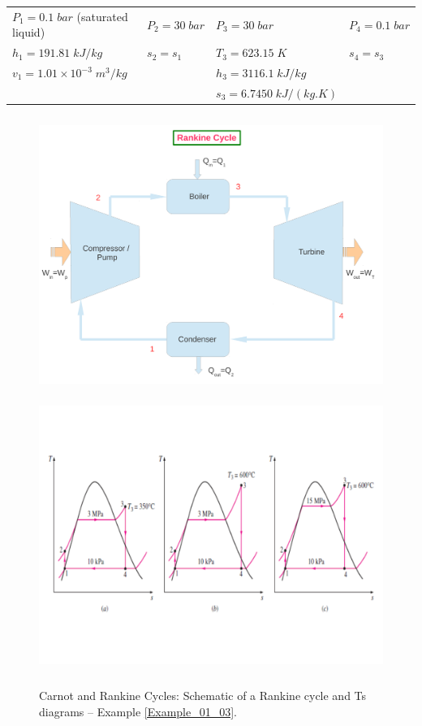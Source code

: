 \begin{enumerate}
\begin{enumerate}
\begin{tabular}{l l l l}
$P_{1}=0.1\;bar$ (saturated liquid) &  $P_{2}=30\;bar$ & $P_{3}=30\;bar$           & $P_{4}=0.1\;bar$ \\
$h_{1}=191.81\;kJ/kg$               &  $s_{2}=s_{1}$   & $T_{3}=623.15\;K$         & $s_{4}=s_{3}$ \\
$v_{1}=1.01\times 10^{-3}\;m^{3}/kg$ &                  & $h_{3}=3116.1\;kJ/kg$     &                 \\
                                    &                 & $s_{3}=6.7450\;kJ/(kg.K)$ &                 \\
\end{tabular}


\begin{figure}[h]
\begin{center}
\vbox{
\includegraphics[width=13.0cm,height=9.0cm]{./../../ThermalEngines/Pics/Simple_Rankine_Cycle_2}
\vspace{-1.cm}
\includegraphics[width=15.0cm,height=9.0cm]{./../../ThermalEngines/Pics/example01_03}
}
\end{center}
\caption{Carnot and Rankine Cycles: Schematic of a Rankine cycle and Ts diagrams -- Example \ref{Example_01_03}.}
\label{Example01_01:Pic3}
\end{figure}


\end{enumerate}
\end{enumerate}
